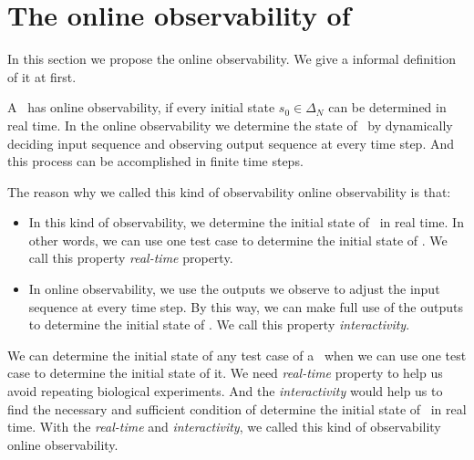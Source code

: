 \section{The online observability of \BCNs}
\label{sec:online}
In this section we propose the online observability. We give a informal definition of it at first. 

	A \BCN\ has online observability, if every initial state $s_0 \in \Delta_N$ can be determined in real time. In the online observability we determine the state of \BCN\ by dynamically deciding input sequence and observing output sequence at every time step. And this process can be accomplished in finite time steps.

The reason why we called this kind of observability online observability is that:
\begin{itemize}
  \item In this kind of observability, we determine the initial state of \BCNs\ in real time. In other words, we can use one test case to determine the initial state of \BCNs. We call this property {\em real-time} property.%
  \item In online observability, we use the outputs we observe to adjust the input sequence at every time step. By this way, we can make full use of the outputs to determine the initial state of \BCNs. We call this property {\em interactivity}.
\end{itemize} 

We can determine the initial state of any test case of a \BCN\ when we can use one test case to determine the initial state of it. We need {\em real-time} property to help us avoid repeating biological experiments. And the {\em interactivity} would help us to find the necessary and sufficient condition of determine the initial state of \BCNs\ in real time. With the  {\em real-time} and {\em interactivity}, we called this kind of observability online observability.

